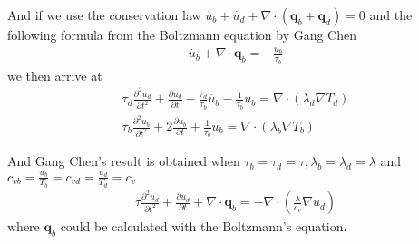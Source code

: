 \documentclass[a4paper]{letter}
\begin{document}
And if we use the conservation law $\dot{u_b}+\dot{u_d}+\nabla \cdot (\mathbf{q}_b+\mathbf{q}_d)=0$ and the following formula from the Boltzmann equation by Gang Chen
\begin{eqnarray}
\dot{u_b}+\nabla \cdot \mathbf{q}_b =-\frac{u_b}{\tau_b}
\end{eqnarray}
we then arrive at
\begin{eqnarray}
\tau_d \frac{\partial^2 u_d}{\partial t^2} + \frac{\partial u_d}{\partial t} -\frac{\tau_d}{\tau_b} \dot{u_b} - \frac{1}{\tau_b} u_b =\nabla \cdot (\lambda_d \nabla T_d) \\
\tau_b \frac{\partial^2 u_b}{\partial t^2} + 2 \frac{\partial u_b}{\partial t} +\frac{1}{\tau_b} u_b =\nabla \cdot (\lambda_b \nabla T_b)
\end{eqnarray}

And Gang Chen's result is obtained when $\tau_b=\tau_d=\tau,\lambda_b=\lambda_d=\lambda$ and $c_{vb}=\frac{u_b}{T_b}=c_{vd}=\frac{u_d}{T_d}=c_v$
\begin{eqnarray}
\tau \frac{\partial^2 u_d}{\partial t^2}+\frac{\partial u_d}{\partial t} +\nabla \cdot \mathbf{q}_b = -\nabla \cdot (\frac{\lambda}{c_v}\nabla u_d)
\end{eqnarray}
where $\mathbf{q}_b$ could be calculated with the Boltzmann's equation.
\end{document}
